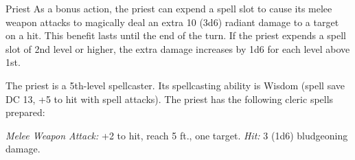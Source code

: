 \documentclass[10pt,a4paper,twoside,twocolumn,openany,nodeprecatedcode]{dndbook}
\begin{document}
\begin{DndMonster}[float=ht]{Priest}
\DndMonsterBasics[
armor-class = {13 (chain shirt)},
hit-points = {\DndDice{5d8 + 5}},
speed = {30 ft.}
]
\DndMonsterAbilityScores[
 str = 10,
 dex = 10,
 con = 12,
 int = 13,
 wis = 16,
 cha = 13
]
\DndMonsterDetails[
skills = {Medicine +7, Persuasion +3, Religion +5},
languages = {any two languages},
challenge = 2,
]
As a bonus action, the priest can expend a spell slot to cause its melee weapon attacks to magically deal an extra 10 (3d6) radiant damage to a target on a hit. This benefit lasts until the end of the turn. If the priest expends a spell slot of 2nd level or higher, the extra damage increases by 1d6 for each level above 1st.

The priest is a 5th-level spellcaster. Its spellcasting ability is Wisdom (spell save DC 13, +5 to hit with spell attacks). The priest has the following cleric spells prepared:
\begin{DndMonsterSpells}
\end{DndMonsterSpells}
\par
{}
\textsl{Melee Weapon Attack:} +2 to hit, reach 5 ft., one target. \textsl{Hit:} 3 (1d6) bludgeoning damage.

\end{DndMonster}


\clearpage
{}
\end{document}
